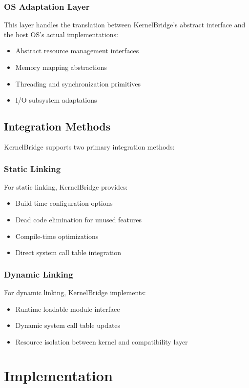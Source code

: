 \documentclass[conference]{IEEEtran}
\begin{document}
\subsubsection{OS Adaptation Layer}
This layer handles the translation between KernelBridge's abstract interface and the host OS's actual implementations:
\begin{itemize}
	\item Abstract resource management interfaces
	\item Memory mapping abstractions
	\item Threading and synchronization primitives
	\item I/O subsystem adaptations
\end{itemize}

\subsection{Integration Methods}
KernelBridge supports two primary integration methods:

\subsubsection{Static Linking}
For static linking, KernelBridge provides:
\begin{itemize}
	\item Build-time configuration options
	\item Dead code elimination for unused features
	\item Compile-time optimizations
	\item Direct system call table integration
\end{itemize}

\subsubsection{Dynamic Linking}
For dynamic linking, KernelBridge implements:
\begin{itemize}
	\item Runtime loadable module interface
	\item Dynamic system call table updates
	\item Resource isolation between kernel and compatibility layer
\end{itemize}

\section{Implementation}
\end{document}

